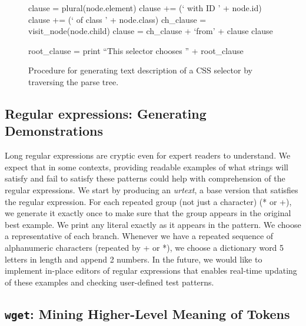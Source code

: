 \begin{figure}
\begin{algorithmic}

    \State clause = plural(node.element)
        \State clause += (` with ID ' + node.id)
        \State clause += (` of class ' + node.class)
    \EndIf
        \State ch\_clause = visit\_node(node.child)
        \State clause = ch\_clause + `from' + clause
    \EndIf
    \State \Return clause
\EndFunction

\State
{}
    \State root\_clause = 
    \State print ``This selector chooses '' + root\_clause
\EndFunction

\end{algorithmic}
\label{alg:css_traversal}
\caption{Procedure for generating text description of a CSS selector by traversing the parse tree.
}
\end{figure}

\subsection{Regular expressions: Generating Demonstrations}

Long regular expressions are cryptic even for expert readers to understand.
We expect that in some contexts, providing readable examples of what strings will satisfy and fail to satisfy these patterns could help with comprehension of the regular expressions.
We start by producing an \emph{urtext}, a base version that satisfies the regular expression. 
For each repeated group (not just a character) (* or +), we generate it exactly once to make sure that the group appears in the original best example.
We print any literal exactly as it appears in the pattern.
We choose a representative of each branch.
Whenever we have a repeated sequence of alphanumeric characters (repeated by + or *), we choose a dictionary word 5 letters in length and append 2 numbers.
In the future, we would like to implement in-place editors of regular expressions that enables real-time updating of these examples and checking user-defined test patterns.

\subsection{\texttt{wget}: Mining Higher-Level Meaning of Tokens}

